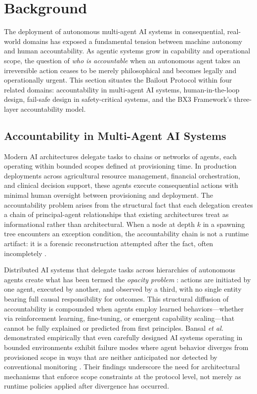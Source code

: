 \section{Background}
\label{sec:background}

The deployment of autonomous multi-agent AI systems in consequential, real-world domains has exposed a fundamental tension between machine autonomy and human accountability. As agentic systems grow in capability and operational scope, the question of \emph{who is accountable} when an autonomous agent takes an irreversible action ceases to be merely philosophical and becomes legally and operationally urgent. This section situates the Bailout Protocol within four related domains: accountability in multi-agent AI systems, human-in-the-loop design, fail-safe design in safety-critical systems, and the BX3 Framework's three-layer accountability model.

\subsection{Accountability in Multi-Agent AI Systems}

Modern AI architectures delegate tasks to chains or networks of agents, each operating within bounded scopes defined at provisioning time. In production deployments across agricultural resource management, financial orchestration, and clinical decision support, these agents execute consequential actions with minimal human oversight between provisioning and deployment. The accountability problem arises from the structural fact that each delegation creates a chain of principal-agent relationships that existing architectures treat as informational rather than architectural. When a node at depth $k$ in a spawning tree encounters an exception condition, the accountability chain is not a runtime artifact: it is a forensic reconstruction attempted after the fact, often incompletely \cite{tristr81}.

Distributed AI systems that delegate tasks across hierarchies of autonomous agents create what has been termed the \emph{opacity problem} \cite{bansal2019}: actions are initiated by one agent, executed by another, and observed by a third, with no single entity bearing full causal responsibility for outcomes. This structural diffusion of accountability is compounded when agents employ learned behaviors—whether via reinforcement learning, fine-tuning, or emergent capability scaling—that cannot be fully explained or predicted from first principles. Bansal \emph{et al.} demonstrated empirically that even carefully designed AI systems operating in bounded environments exhibit failure modes where agent behavior diverges from provisioned scope in ways that are neither anticipated nor detected by conventional monitoring \cite{bansal2019}. Their findings underscore the need for architectural mechanisms that enforce scope constraints at the protocol level, not merely as runtime policies applied after divergence has occurred.

